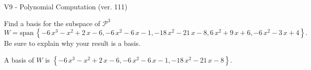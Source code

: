 \begin{exercise}
  \begin{exerciseTitle}V9 - Polynomial Computation (ver. 111)\end{exerciseTitle}
  \begin{exerciseStatement}
    Find a basis for the subspace of \(\mathcal{P}^3\) 
\[W=\mathrm{span}\ \left\{-6 \, x^{3} - x^{2} + 2 \, x - 6 , -6 \, x^{2} - 6 \, x - 1 , -18 \, x^{2} - 21 \, x - 8 , 6 \, x^{2} + 9 \, x + 6 , -6 \, x^{2} - 3 \, x + 4\right\}.\]
 Be sure to explain why your result is a basis.


  \end{exerciseStatement}
  \begin{exerciseAnswer}
   A basis of \(W\) is  \(\left\{-6 \, x^{3} - x^{2} + 2 \, x - 6 , -6 \, x^{2} - 6 \, x - 1 , -18 \, x^{2} - 21 \, x - 8\right\}\).
  


  \end{exerciseAnswer}
\end{exercise}